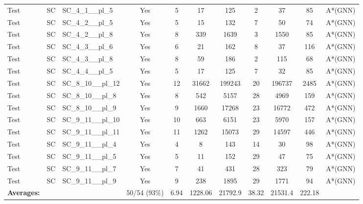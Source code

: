 \documentclass{article}
\begin{document}
\begin{tabular}{lllcccccccc}
Test & SC & SC\_4\_1\_\_pl\_5 & Yes & 5 & 17 & 125 & 2 & 37 & 85 & A*(GNN) \\
Test & SC & SC\_4\_2\_\_pl\_5 & Yes & 5 & 15 & 132 & 7 & 50 & 74 & A*(GNN) \\
Test & SC & SC\_4\_2\_\_pl\_8 & Yes & 8 & 339 & 1639 & 3 & 1550 & 85 & A*(GNN) \\
Test & SC & SC\_4\_3\_\_pl\_6 & Yes & 6 & 21 & 162 & 8 & 37 & 116 & A*(GNN) \\
Test & SC & SC\_4\_3\_\_pl\_8 & Yes & 8 & 59 & 186 & 2 & 115 & 68 & A*(GNN) \\
Test & SC & SC\_4\_4\_\_pl\_5 & Yes & 5 & 17 & 125 & 7 & 32 & 85 & A*(GNN) \\
Test & SC & SC\_8\_10\_\_pl\_12 & Yes & 12 & 31662 & 199243 & 20 & 196737 & 2485 & A*(GNN) \\
Test & SC & SC\_8\_10\_\_pl\_8 & Yes & 8 & 542 & 5157 & 28 & 4969 & 159 & A*(GNN) \\
Test & SC & SC\_8\_10\_\_pl\_9 & Yes & 9 & 1660 & 17268 & 23 & 16772 & 472 & A*(GNN) \\
Test & SC & SC\_9\_11\_\_pl\_10 & Yes & 10 & 663 & 6151 & 23 & 5970 & 157 & A*(GNN) \\
Test & SC & SC\_9\_11\_\_pl\_11 & Yes & 11 & 1262 & 15073 & 29 & 14597 & 446 & A*(GNN) \\
Test & SC & SC\_9\_11\_\_pl\_4 & Yes & 4 & 8 & 143 & 14 & 30 & 98 & A*(GNN) \\
Test & SC & SC\_9\_11\_\_pl\_5 & Yes & 5 & 11 & 152 & 29 & 47 & 75 & A*(GNN) \\
Test & SC & SC\_9\_11\_\_pl\_7 & Yes & 7 & 41 & 431 & 28 & 323 & 79 & A*(GNN) \\
Test & SC & SC\_9\_11\_\_pl\_9 & Yes & 9 & 238 & 1895 & 29 & 1771 & 94 & A*(GNN) \\
\textbf{Averages:} & & & 50/54 (93\%) & 6.94 & 1228.06 & 21792.9 & 38.32 & 21531.4 & 222.18 & \\
\bottomrule
\end{tabular}
\newpage
\end{document}
